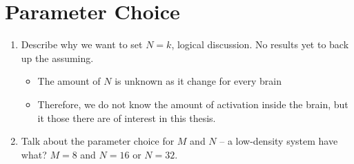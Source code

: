 \section{Parameter Choice}
\begin{enumerate}
\item Describe why we want to set $N = k$, logical discussion. No results yet to back up the assuming.
	\begin{itemize}
	\item The amount of $N$ is unknown as it change for every brain
	\item Therefore, we do not know the amount of activation inside the brain, but it those there are of interest in this thesis.
	\end{itemize}
\item Talk about the parameter choice for $M$ and $N$ -- a low-density system have what? $M =  8$ and $N = 16$ or $N = 32$.
\end{enumerate}
